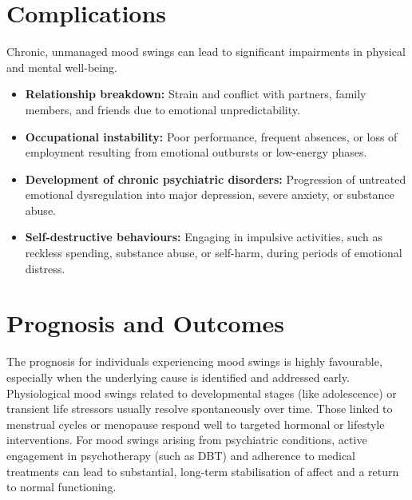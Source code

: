 \section*{Complications}
Chronic, unmanaged mood swings can lead to significant impairments in physical and mental well-being.
\begin{itemize}
    \item \textbf{Relationship breakdown:} Strain and conflict with partners, family members, and friends due to emotional unpredictability.
    \item \textbf{Occupational instability:} Poor performance, frequent absences, or loss of employment resulting from emotional outbursts or low-energy phases.
    \item \textbf{Development of chronic psychiatric disorders:} Progression of untreated emotional dysregulation into major depression, severe anxiety, or substance abuse.
    \item \textbf{Self-destructive behaviours:} Engaging in impulsive activities, such as reckless spending, substance abuse, or self-harm, during periods of emotional distress.
\end{itemize}

\section*{Prognosis and Outcomes}
The prognosis for individuals experiencing mood swings is highly favourable, especially when the underlying cause is identified and addressed early. Physiological mood swings related to developmental stages (like adolescence) or transient life stressors usually resolve spontaneously over time. Those linked to menstrual cycles or menopause respond well to targeted hormonal or lifestyle interventions. For mood swings arising from psychiatric conditions, active engagement in psychotherapy (such as DBT) and adherence to medical treatments can lead to substantial, long-term stabilisation of affect and a return to normal functioning.

